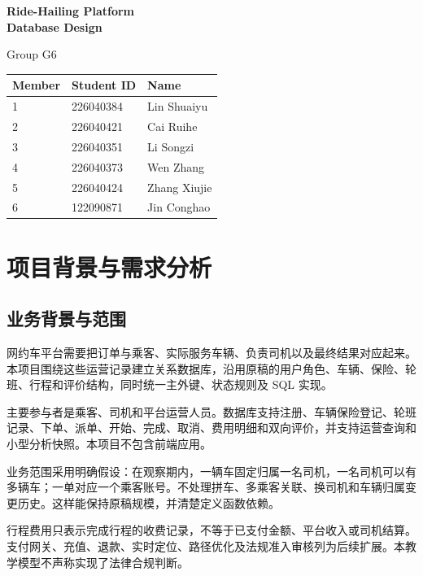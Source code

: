 \documentclass[11pt,a4paper]{article}
\begin{document}
\begin{titlepage}\thispagestyle{empty}\centering\vspace*{2cm}
{\fontsize{26}{34}\selectfont\bfseries Ride-Hailing Platform\\[4pt]Database Design\par}\vspace{1.1cm}
{\Large Group G6\par}\vspace{1.2cm}
\par\begingroup\small\noindent
\begin{tabularx}{\linewidth}{p{2cm}p{4cm}p{4cm}}
\toprule
Member & Student ID & Name\\\midrule
1 & 226040384 & Lin Shuaiyu\\
2 & 226040421 & Cai Ruihe\\
3 & 226040351 & Li Songzi\\
4 & 226040373 & Wen Zhang\\
5 & 226040424 & Zhang Xiujie\\
6 & 122090871 & Jin Conghao\\
\bottomrule
\end{tabularx}
\par\endgroup
\end{titlepage}
\begingroup\small\setlength{\parskip}{0pt}\tableofcontents\endgroup\clearpage{}
\section{项目背景与需求分析}
\subsection{业务背景与范围}
网约车平台需要把订单与乘客、实际服务车辆、负责司机以及最终结果对应起来。本项目围绕这些运营记录建立关系数据库，沿用原稿的用户角色、车辆、保险、轮班、行程和评价结构，同时统一主外键、状态规则及 SQL 实现。

主要参与者是乘客、司机和平台运营人员。数据库支持注册、车辆保险登记、轮班记录、下单、派单、开始、完成、取消、费用明细和双向评价，并支持运营查询和小型分析快照。本项目不包含前端应用。

业务范围采用明确假设：在观察期内，一辆车固定归属一名司机，一名司机可以有多辆车；一单对应一个乘客账号。不处理拼车、多乘客关联、换司机和车辆归属变更历史。这样能保持原稿规模，并清楚定义函数依赖。

行程费用只表示完成行程的收费记录，不等于已支付金额、平台收入或司机结算。支付网关、充值、退款、实时定位、路径优化及法规准入审核列为后续扩展。本教学模型不声称实现了法律合规判断。
\end{document}
